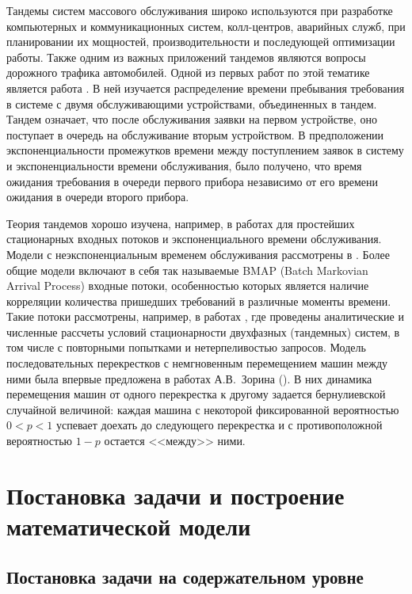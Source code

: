 \documentclass[a4paper,12pt,russian]{extarticle}
\begin{document}
Тандемы систем массового обслуживания широко используются при разработке компьютерных и коммуникационных систем, колл-центров, аварийных служб, при планировании их мощностей, производительности и последующей оптимизации работы. Также одним из важных приложений тандемов являются вопросы дорожного трафика автомобилей. 
Одной из первых работ по этой тематике является работа \cite{Reich:1957}. В ней изучается распределение времени пребывания требования в системе с двумя обслуживающими устройствами, объединенных в тандем. Тандем означает, что после обслуживания заявки на первом устройстве, оно поступает в очередь на обслуживание вторым устройством. В предположении экспоненциальности промежутков времени между поступлением заявок в систему и экспоненциальности времени обслуживания, было получено, что время ожидания требования в очереди первого прибора независимо от его времени ожидания в очереди второго прибора. 

Теория тандемов хорошо изучена, например, в работах \cite{Balsamo:2003, Gnedenko:Konig:1983, Perros:1994, Perros:1989} для простейших стационарных входных потоков и экспоненциального времени обслуживания. Модели с неэкспоненциальным временем обслуживания рассмотрены в \cite{Gomez:2002:1, Gomez:2002:2, Gomez:2002:3}. Более общие модели включают в себя так называемые BMAP (Batch Markovian Arrival Process) входные потоки, особенностью которых является наличие корреляции количества пришедших требований в различные моменты времени. Такие потоки рассмотрены, например, в работах \cite{Klimenok:Dudin:2005,Klimenok:Dudin:2004, Klimenok:2010, Klimenok:2011, Klimenok:2015}, где проведены аналитические и численные рассчеты условий стационарности двухфазных (тандемных) систем, в том числе с повторными попытками и нетерпеливостью запросов. Модель последовательных перекрестков с немгновенным перемещением машин между ними была впервые предложена в работах А.В.~Зорина (\cite{Zorine:2010, Zorine:2011:2, Zorine:2012}). В них динамика перемещения машин от одного перекрестка к другому задается бернулиевской случайной величиной: каждая машина с некоторой фиксированной вероятностью $0<p<1$ успевает доехать до следующего перекрестка и с противоположной вероятностью $1-p$ остается <<между>> ними.

\section{Постановка задачи и построение математической модели}

\subsection{Постановка задачи на содержательном уровне}
\end{document}
